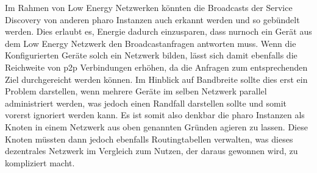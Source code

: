 	Im Rahmen von Low Energy Netzwerken könnten die Broadcasts der Service Discovery von anderen pharo Instanzen auch erkannt werden und so gebündelt werden. Dies erlaubt es, Energie dadurch einzusparen, dass nurnoch ein Gerät aus dem Low Energy Netzwerk den Broadcastanfragen antworten muss. Wenn die Konfigurierten Geräte solch ein Netzwerk bilden, lässt sich damit ebenfalls die Reichweite von p2p Verbindungen erhöhen, da die Anfragen zum entsprechenden Ziel durchgereicht werden können. Im Hinblick auf Bandbreite sollte dies erst ein Problem darstellen, wenn mehrere Geräte im selben Netzwerk parallel administriert werden, was jedoch einen Randfall darstellen sollte und somit vorerst ignoriert werden kann. Es ist somit also denkbar die pharo Instanzen als Knoten in einem Netzwerk aus oben genannten Gründen agieren zu lassen. Diese Knoten müssten dann jedoch ebenfalls Routingtabellen verwalten, was dieses dezentrales Netzwerk im Vergleich zum Nutzen, der daraus gewonnen wird, zu kompliziert macht.
	
	